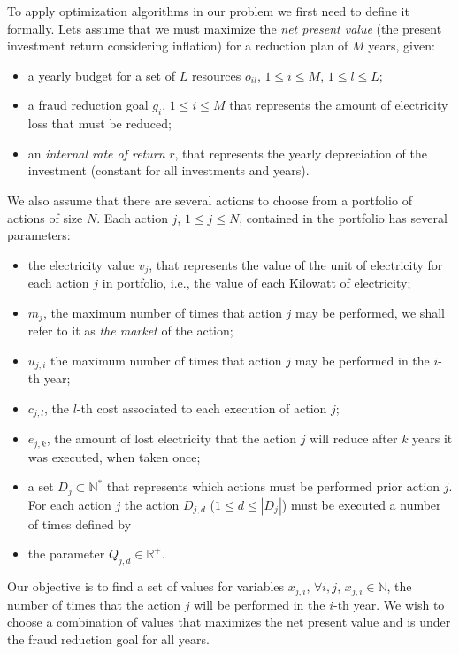 To apply optimization algorithms in our problem we first need to define it formally. Lets assume
that we must maximize the \textit{net present value} (the present investment return considering 
inflation) for a reduction plan of $M$ years, given:

\begin{itemize}
    \item a yearly budget for a set of $L$ resources $o_{il}$, $1 \le i \le M$, $1 \le l \le L$;
    
    \item a fraud reduction goal $g_i$, $1 \le i \le M$ that represents the
    amount of electricity loss that must be reduced;

    \item an \textit{internal rate of return} $r$, that represents the yearly depreciation of the investment
    (constant for all investments and years). 

\end{itemize}

We also assume that there are several actions to choose from a portfolio of actions of size $N$.
Each action $j$, $1 \le j \le N$, contained in the portfolio has several parameters: 
\begin{itemize}
    \item the electricity value $v_j$, that represents the value of the unit of electricity for each action $j$ in portfolio,
    i.e., the value of each Kilowatt of electricity;
    \item $m_j$, the maximum number of times that action $j$ may be performed, we
    shall refer to it as \textit{the market} of the action;
    \item $u_{j,i}$ the maximum number of times that action $j$ may be performed in the $i$-th year;
    \item $c_{j,l}$, the $l$-th cost associated to each execution of action $j$;
    \item $e_{j,k}$, the amount of lost electricity that the action $j$ will reduce after 
    $k$ years it was executed, when taken once;
    \item a set $D_j \subset \mathbb{N^*}$ that represents which actions must be performed prior action $j$.
    For each action $j$ the action $D_{j,d}$ ($1 \le d \le |D_j|$) must be executed a number of times defined by
    \item the parameter $Q_{j,d} \in \mathbb{R^+}$.
\end{itemize}

Our objective is to find a set of values for variables $x_{j,i}$, $\forall i,j$, $x_{j,i} \in \mathbb{N} $, 
the number of times that the action $j$ will be performed in the $i$-th year. We wish to choose a combination
of values that maximizes the net present value and is under the fraud reduction goal for all years. 

